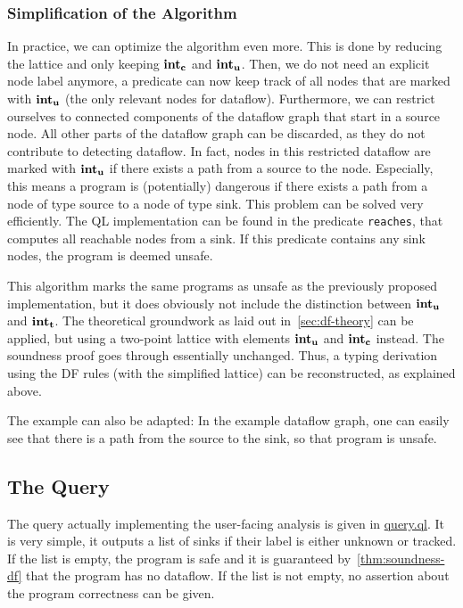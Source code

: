 \subsubsection*{Simplification of the Algorithm}
In practice, we can optimize the algorithm even more.
This is done by reducing the lattice and only keeping $\textbf{int}_\textbf{c}$ and $\textbf{int}_\textbf{u}$.
Then, we do not need an explicit node label anymore, a predicate can now
keep track of all nodes that are marked with $\textbf{int}_\textbf{u}$ (the only relevant nodes 
for dataflow).
Furthermore, we can restrict ourselves to connected components of the dataflow graph
that start in a source node.
All other parts of the dataflow graph can be discarded, as they do not contribute 
to detecting dataflow.
In fact, nodes in this restricted dataflow are marked with $\textbf{int}_\textbf{u}$ if there
exists a path from a source to the node.
Especially, this means a program is (potentially) dangerous if there exists a path
from a node of type source to a node of type sink.
This problem can be solved very efficiently.
The QL implementation can be found in the predicate \texttt{reaches},
that computes all reachable nodes from a sink.
If this predicate contains any sink nodes, the program is deemed unsafe.

This algorithm marks the same programs as unsafe as the previously proposed implementation,
but it does obviously not include the distinction between $\textbf{int}_\textbf{u}$ and $\textbf{int}_\textbf{t}$.
The theoretical groundwork as laid out in~\autoref{sec:df-theory} can be applied,
but using a two-point lattice with elements $\textbf{int}_\textbf{u}$ and $\textbf{int}_\textbf{c}$ instead.
The soundness proof goes through essentially unchanged.
Thus, a typing derivation using the DF rules (with the simplified lattice) 
can be reconstructed, as explained above.

The example can also be adapted: In the example dataflow graph, one can easily
see that there is a path from the source to the sink, so that program is unsafe.

\subsection{The Query}
The query actually implementing the user-facing analysis is given in \hyperref[lst:query]{query.ql}.
It is very simple, it outputs a list of sinks if their label is either unknown or tracked.
If the list is empty, the program is safe and it is guaranteed by~\autoref{thm:soundness-df}
that the program has no dataflow.
If the list is not empty, no assertion about the program correctness can be given.
